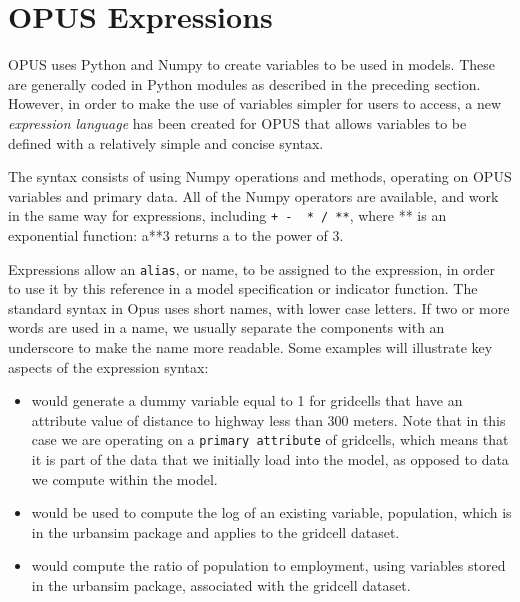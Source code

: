 \section{OPUS Expressions}
\label{sec:expressions}

OPUS uses Python and Numpy to create variables to be used in models.  These are generally coded in Python modules as
described in the preceding section.  However, in order to make the use of variables simpler for users to access, a new
\emph{expression language} has been created for OPUS
that allows variables to be defined with a relatively simple and concise syntax.  

The syntax consists of using Numpy operations and methods, operating on OPUS variables and primary data.  All of the Numpy operators are available, and work in the same way for expressions, including \verb#+ -  * / **#, where ** is an exponential function: a**3 returns a to the power of 3.

Expressions allow an \verb#alias#, or name, to be assigned to the expression, in order to use it by this reference in a model specification or indicator function.  The standard syntax in Opus uses short names, with lower case letters.  If two or more words are used in a name, we usually separate the components with an underscore to make the name more readable.  Some examples will illustrate key aspects of the expression syntax:

\begin{itemize}

\item {} would generate a dummy variable equal to 1 for gridcells that have an attribute value of distance to highway less than 300 meters.  Note that in this case we are operating on a \verb#primary attribute# of gridcells, which means that it is part of the data that we initially load into the model, as opposed to data we compute within the model.

\item {} would be used to compute the log of an existing variable, population, which is in the urbansim package and applies to the gridcell dataset.

\item {} would compute the ratio of population to employment, using variables stored in the urbansim package, associated with the gridcell dataset.  

\end{itemize}

